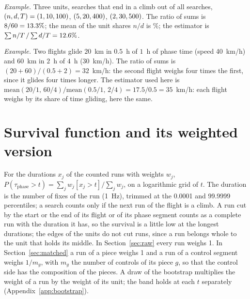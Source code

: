 \emph{Example.} Three units, searches that end in a climb out of all searches, $(n,d,T)=(1,10,100)$, $(5,20,400)$, $(2,30,500)$. The ratio of sums is $8/60=13.3\%$; the mean of the unit shares
$n/d$ is \ToyMeanShare\%; the estimator is $\sum n/T\,/\sum d/T=12.6\%$.

\begin{table}
\centering\small

\caption{Open flights, raw, pieces of dataset 1000, unit the flight: each statistic as \emph{average first, ratio after} / \emph{ratio of sums}, for $\Sl$, $\A$ and $\G$, with the flights and the phase time (h) they rest on.}
\label{tab:ratio}
\end{table}

\emph{Example.} Two flights glide $20$~km in $0.5$~h of $1$~h of phase time (speed 40~km/h) and $60$~km in $2$~h of $4$~h (30~km/h). The ratio of sums is $(20+60)/(0.5+2)=32$~km/h: the second flight weighs four times the first, since it glides four times longer.
The estimator used here is $\mathrm{mean}(20/1,\,60/4)/\mathrm{mean}(0.5/1,\,2/4)=17.5/0.5=35$~km/h: each flight weighs by its share of time gliding, here the same.

\section{Survival function and its weighted version}\label{app:survival}

For the durations $x_j$ of the counted runs with weights $w_j$, $P(\tau_\text{phase}>t)=\sum_j w_j[x_j>t]\big/\sum_j w_j$, on a logarithmic grid of $t$. The duration is the number of fixes of the run (1~Hz), trimmed at the 0.0001 and 99.9999 percentiles; a search counts only if the next run of the flight is a climb.
A run cut by the start or the end of its flight or of its phase segment counts as a complete run with the duration it has, so the survival is a little low at the longest durations; the edges of the units do not cut runs, since a run belongs whole to the unit that holds its middle.
In Section~\ref{sec:raw} every run weighs 1. In Section~\ref{sec:matched} a run of a piece weighs 1 and a run of a control segment weighs $1/m_g$, with $m_g$ the number of controls of its piece $g$, so that the control side has the composition of the pieces.
A draw of the bootstrap multiplies the weight of a run by the weight of its unit; the band holds at each $t$ separately (Appendix~\ref{app:bootstrap}).

